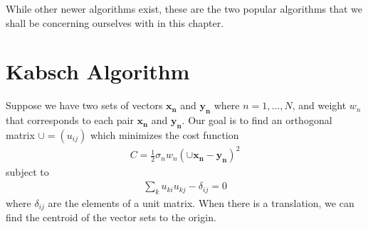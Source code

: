  While other newer algorithms exist, these are the two popular algorithms that we shall be concerning ourselves with in this chapter.
 
 \section{Kabsch Algorithm}
 
 Suppose we have two sets of vectors $\bm{x_n}$ and $\bm{y_n}$ where $n=1,\ldots, N$, and weight $w_n$ that corresponds to each pair $\bm{x_n}$ and $\bm{y_n}$. Our goal is to find an orthogonal matrix $\cup = (u_{ij})$ which minimizes the cost function
 \begin{align}
 	C = \frac{1}{2} \sigma_n w_n \left(\cup \bm{x_n} - \bm{y_n}\right)^2 
 \end{align}
 subject to 
 \begin{align}
 	\sum_k u_{ki} u_{kj} - \delta_{ij} = 0
 	\label{eq:kabsch_constraint}
 \end{align}
 where $\delta_{ij}$ are the elements of a unit matrix. When there is a translation, we can find the centroid of the vector sets to the origin.
 
